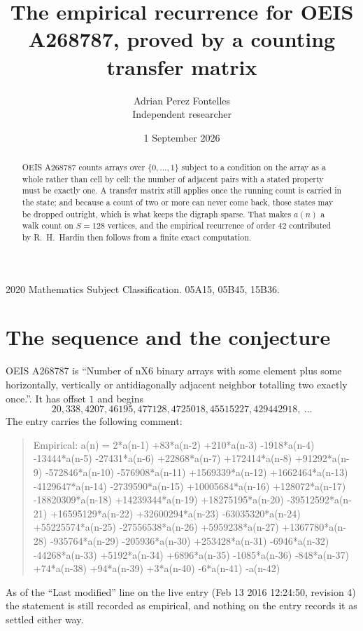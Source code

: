 \documentclass[11pt,a4paper]{article}
\title{The empirical recurrence for OEIS A268787, proved by a counting transfer matrix}
\author{Adrian Perez Fontelles\\ \small Independent researcher}
\date{1 September 2026}
\theoremstyle{plain}
\theoremstyle{definition}
\begin{document}
\maketitle

\begin{abstract}
OEIS A268787 counts arrays over $\{0,\dots,1\}$ subject to a condition on the array as a
whole rather than cell by cell: the number of adjacent pairs with a stated property must be
exactly one. A transfer matrix still applies once the running count is carried in the state; and
because a count of two or more can never come back, those states may be dropped outright,
which is what keeps the digraph sparse. That makes $a(n)$ a walk count on $S=128$ vertices,
and the empirical recurrence of order $42$ contributed by R.~H.~Hardin then follows from
a finite exact computation.
\end{abstract}

\noindent\small 2020 Mathematics Subject Classification. 05A15, 05B45, 15B36.\normalsize

\section{The sequence and the conjecture}

OEIS A268787 is ``Number of nX6 binary arrays with some element plus some horizontally, vertically or antidiagonally adjacent neighbor totalling two exactly once.''. It has offset $1$ and begins
\[
20, 338, 4207, 46195, 477128, 4725018, 45515227, 429442918,\ \dots
\]
The entry carries the following comment:
\begin{quote}\small
Empirical: a(n) = 2*a(n-1) +83*a(n-2) +210*a(n-3) -1918*a(n-4) -13444*a(n-5) -27431*a(n-6) +22868*a(n-7) +172414*a(n-8) +91292*a(n-9) -572846*a(n-10) -576908*a(n-11) +1569339*a(n-12) +1662464*a(n-13) -4129647*a(n-14) -2739590*a(n-15) +10005684*a(n-16) +128072*a(n-17) -18820309*a(n-18) +14239344*a(n-19) +18275195*a(n-20) -39512592*a(n-21) +16595129*a(n-22) +32600294*a(n-23) -63035320*a(n-24) +55225574*a(n-25) -27556538*a(n-26) +5959238*a(n-27) +1367780*a(n-28) -935764*a(n-29) -205936*a(n-30) +253428*a(n-31) -6946*a(n-32) -44268*a(n-33) +5192*a(n-34) +6896*a(n-35) -1085*a(n-36) -848*a(n-37) +74*a(n-38) +94*a(n-39) +3*a(n-40) -6*a(n-41) -a(n-42)
\end{quote}
As of the ``Last modified'' line on the live entry (Feb 13 2016 12:24:50, revision 4) the statement is
still recorded as empirical, and nothing on the entry records it as settled either way.
\end{document}
